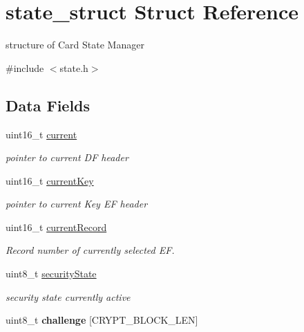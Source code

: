 \hypertarget{structstate__struct}{\section{state\-\_\-struct Struct Reference}
\label{structstate__struct}
}


structure of Card State Manager  




{\ttfamily \#include $<$state.\-h$>$}

\subsection*{Data Fields}
\begin{DoxyCompactItemize}
\item 
\hypertarget{structstate__struct_a44f444796209e11c168fa0e9f76952c8}{uint16\-\_\-t \hyperlink{structstate__struct_a44f444796209e11c168fa0e9f76952c8}{current}}\label{structstate__struct_a44f444796209e11c168fa0e9f76952c8}

\begin{DoxyCompactList}\small\item\em pointer to current D\-F header \end{DoxyCompactList}\item 
\hypertarget{structstate__struct_aa7aaedf8e6c5652dc25deb09d0cb0f71}{uint16\-\_\-t \hyperlink{structstate__struct_aa7aaedf8e6c5652dc25deb09d0cb0f71}{current\-Key}}\label{structstate__struct_aa7aaedf8e6c5652dc25deb09d0cb0f71}

\begin{DoxyCompactList}\small\item\em pointer to current Key E\-F header \end{DoxyCompactList}\item 
\hypertarget{structstate__struct_a4295fe2f74804188217ce9b1e28ab755}{uint16\-\_\-t \hyperlink{structstate__struct_a4295fe2f74804188217ce9b1e28ab755}{current\-Record}}\label{structstate__struct_a4295fe2f74804188217ce9b1e28ab755}

\begin{DoxyCompactList}\small\item\em Record number of currently selected E\-F. \end{DoxyCompactList}\item 
\hypertarget{structstate__struct_ae9028514070f3109f7379b48341b795a}{uint8\-\_\-t \hyperlink{structstate__struct_ae9028514070f3109f7379b48341b795a}{security\-State}}\label{structstate__struct_ae9028514070f3109f7379b48341b795a}

\begin{DoxyCompactList}\small\item\em security state currently active \end{DoxyCompactList}\item 
\hypertarget{structstate__struct_ac1634e1b5b7427a1ca97b296fdba2df1}{uint8\-\_\-t {\bfseries challenge} \mbox{[}C\-R\-Y\-P\-T\-\_\-\-B\-L\-O\-C\-K\-\_\-\-L\-E\-N\mbox{]}}\label{structstate__struct_ac1634e1b5b7427a1ca97b296fdba2df1}

\end{DoxyCompactItemize}


